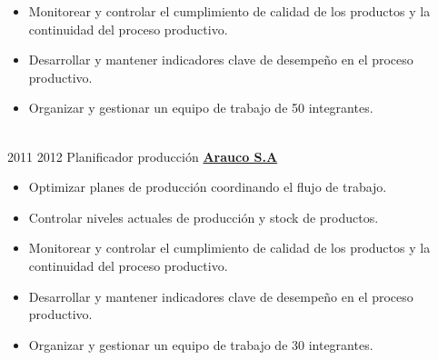 \documentclass[letterpaper]{DS_class_file} %
\begin{document}
\begin{twenty}
{\begin{itemize}
			\item Monitorear y controlar el cumplimiento de calidad de los productos y la continuidad del proceso productivo.
			\item Desarrollar y mantener indicadores clave de desempeño en el proceso productivo.
			\item Organizar y gestionar un equipo de trabajo de 50 integrantes.
	\end{itemize}}
	\\
	\twentyitem
	{2011}
	{2012}
	{\hspace{0.3cm}Planificador producción}
	{\href{https://www.arauco.cl/chile/}{\textbf{Arauco S.A}}}
	{}
	{\begin{itemize}
			\item Optimizar planes de producción coordinando el flujo de trabajo.
			\item Controlar niveles actuales de producción y stock de productos.
			\item Monitorear y controlar el cumplimiento de calidad de los productos y la continuidad del proceso productivo.
			\item Desarrollar y mantener indicadores clave de desempeño en el proceso productivo.
			\item Organizar y gestionar un equipo de trabajo de 30 integrantes.
	\end{itemize}}
\end{twenty}
\end{document}
